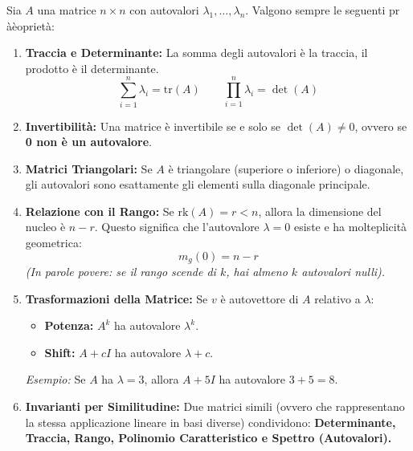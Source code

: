 \documentclass[10pt,a4paper]{article}
\begin{document}
\begin{tcolorbox}[colback=orange!5!white,colframe=orange!75!black,title=\textbf{PROPRIETÀ FONDAMENTALI E TRU}]
Sia $A$ una matrice $n \times n$ con autovalori $\lambda_1, \dots, \lambda_n$. Valgono sempre le seguenti pr
àèoprietà:

\begin{enumerate}
    \item \textbf{Traccia e Determinante:}
    La somma degli autovalori è la traccia, il prodotto è il determinante.
    \[ \sum_{i=1}^n \lambda_i = \text{tr}(A) \qquad \prod_{i=1}^n \lambda_i = \det(A) \]
    
    \item \textbf{Invertibilità:}
    Una matrice è invertibile se e solo se $\det(A) \neq 0$, ovvero se \textbf{0 non è un autovalore}.
    
    \item \textbf{Matrici Triangolari:}
    Se $A$ è triangolare (superiore o inferiore) o diagonale, gli autovalori sono esattamente gli elementi sulla diagonale principale.
    
    \item \textbf{Relazione con il Rango:}
    Se $\text{rk}(A) = r < n$, allora la dimensione del nucleo è $n-r$.
    Questo significa che l'autovalore $\lambda = 0$ esiste e ha molteplicità geometrica:
    \[ m_g(0) = n - r \]
    \textit{(In parole povere: se il rango scende di $k$, hai almeno $k$ autovalori nulli).}
    
    \item \textbf{Trasformazioni della Matrice:}
    Se $v$ è autovettore di $A$ relativo a $\lambda$:
    \begin{itemize}
        \item \textbf{Potenza:} $A^k$ ha autovalore $\lambda^k$.
        \item \textbf{Shift:} $A + cI$ ha autovalore $\lambda + c$.
    \end{itemize}
    \textit{Esempio:} Se $A$ ha $\lambda=3$, allora $A+5I$ ha autovalore $3+5=8$.
    
    \item \textbf{Invarianti per Similitudine:}
    Due matrici simili (ovvero che rappresentano la stessa applicazione lineare in basi diverse) condividono:
    \textbf{Determinante, Traccia, Rango, Polinomio Caratteristico e Spettro (Autovalori).}
\end{enumerate}
\end{tcolorbox}
\vspace{0.3cm}
\end{document}
